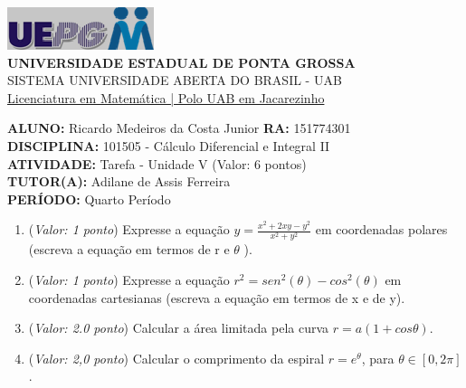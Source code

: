 \documentclass[a4paper, 12pt]{article}
\begin{document}
\begin{flushleft}\includegraphics{logo}\\
\textbf{UNIVERSIDADE ESTADUAL DE PONTA GROSSA} \\
SISTEMA UNIVERSIDADE ABERTA DO BRASIL - UAB \\
\underline{Licenciatura em Matemática | Polo UAB em Jacarezinho}\end{flushleft} 
\textbf{ALUNO:} Ricardo Medeiros da Costa Junior   \textbf{RA:} 151774301 \\
\textbf{DISCIPLINA:} 101505 - Cálculo Diferencial e Integral II \\
\textbf{ATIVIDADE:} Tarefa - Unidade V (Valor: 6 pontos) \\
\textbf{TUTOR(A):} Adilane de Assis Ferreira \\
\textbf{PERÍODO:} Quarto Período \\
\begin{enumerate}
\item ({\it Valor: 1 ponto}) Expresse a equação $ y = \frac{x^{2}+2xy-y^{2}}{x^{2}+y^{2}} $ em coordenadas polares (escreva a equação em termos de r e $ \theta $ ).
\item ({\it Valor: 1 ponto}) Expresse a equação $ r^{2} = sen^{2}( \theta )-cos^{2}( \theta ) $ em coordenadas cartesianas (escreva a equação em termos de x e de y).
\item ({\it Valor: 2.0 ponto}) Calcular a área limitada pela curva $r = a(1+cos \theta) $.
\item ({\it Valor: 2,0 ponto}) Calcular o comprimento da espiral $ r = e^{ \theta } $, para $ \theta \in [0,2\pi] $. 
  
\end{enumerate}
\end{document}
